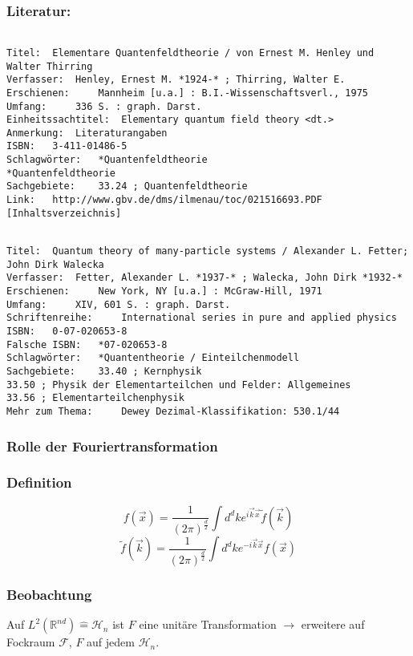 \documentclass[twoside,a4paper]{scrartcl}
\newcommand{\R}{\mathbb{R}}
\renewcommand{\1}{\mathds{1}}
\newcommand{\ra}{\rightarrow}
\renewcommand{\H}{\mathcal{H}}
\newcommand{\F}{\mathcal{F}}
\renewcommand{\R}{\mathbb{R}}
\begin{document}
\subsubsection*{Literatur:}
\begin{tiny}
\begin{verbatim}

Titel: 	Elementare Quantenfeldtheorie / von Ernest M. Henley und Walter Thirring
Verfasser: 	Henley, Ernest M. *1924-* ; Thirring, Walter E.
Erschienen: 	Mannheim [u.a.] : B.I.-Wissenschaftsverl., 1975
Umfang: 	336 S. : graph. Darst.
Einheitssachtitel: 	Elementary quantum field theory <dt.>
Anmerkung: 	Literaturangaben
ISBN: 	3-411-01486-5
Schlagwörter: 	*Quantenfeldtheorie
*Quantenfeldtheorie
Sachgebiete: 	33.24 ; Quantenfeldtheorie
Link: 	http://www.gbv.de/dms/ilmenau/toc/021516693.PDF [Inhaltsverzeichnis]
\end{verbatim}
\end{tiny}


\begin{tiny}
\begin{verbatim}

Titel: 	Quantum theory of many-particle systems / Alexander L. Fetter; John Dirk Walecka
Verfasser: 	Fetter, Alexander L. *1937-* ; Walecka, John Dirk *1932-*
Erschienen: 	New York, NY [u.a.] : McGraw-Hill, 1971
Umfang: 	XIV, 601 S. : graph. Darst.
Schriftenreihe: 	International series in pure and applied physics
ISBN: 	0-07-020653-8
Falsche ISBN: 	*07-020653-8
Schlagwörter: 	*Quantentheorie / Einteilchenmodell
Sachgebiete: 	33.40 ; Kernphysik
33.50 ; Physik der Elementarteilchen und Felder: Allgemeines
33.56 ; Elementarteilchenphysik
Mehr zum Thema: 	Dewey Dezimal-Klassifikation: 530.1/44
\end{verbatim}
\end{tiny}

\subsubsection*{Rolle der Fouriertransformation}
\subsubsection*{Definition}
$$f(\vec x)=\frac{1}{(2\pi)^{\frac{d}{2}}}\int d^dk e^{i\vec k\vec x} \tilde f(\vec k)$$
$$\tilde f(\vec k)=\frac{1}{(2\pi)^{\frac{d}{2}}}\int d^dk e^{-i\vec k\vec x} f(\vec x)$$
\subsubsection*{Beobachtung}
Auf $L^2(\R^{nd}) \mathrel{\widehat{=}} \H_n$ ist $F$ eine unitäre Transformation $\ra$ erweitere auf Fockraum $\F$, $F$ auf jedem $\H_n$.
\end{document}
